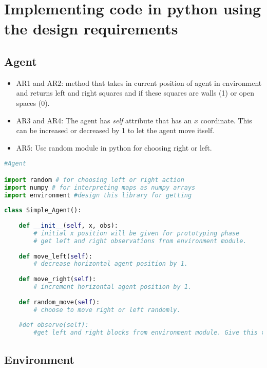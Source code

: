 \documentclass{article}
\begin{document}
\section{Implementing code in python using the design requirements}

\subsection{Agent}

\begin{itemize}
    \item AR1 and AR2: method that takes in current position of agent in environment and returns left and right squares and if these squares are walls (1) or open spaces (0).
    \item AR3 and AR4: The agent has \textit{self} attribute that has an $x$ coordinate. This can be increased or decreased by 1 to let the agent move itself.
    \item AR5: Use random module in python for choosing right or left.
\end{itemize}


\begin{lstlisting}[language=Python, caption=Agent class outline]
#Agent

import random # for choosing left or right action
import numpy # for interpreting maps as numpy arrays
import environment #design this library for getting
    
class Simple_Agent():
    
    def __init__(self, x, obs):
        # initial x position will be given for prototyping phase
        # get left and right observations from environment module.
        
    def move_left(self):
        # decrease horizontal agent position by 1.
    
    def move_right(self):
        # increment horizontal agent position by 1.
        
    def random_move(self):
        # choose to move right or left randomly.
        
    #def observe(self):
        #get left and right blocks from environment module. Give this to the agent
\end{lstlisting}




\subsection{Environment}
\end{document}
